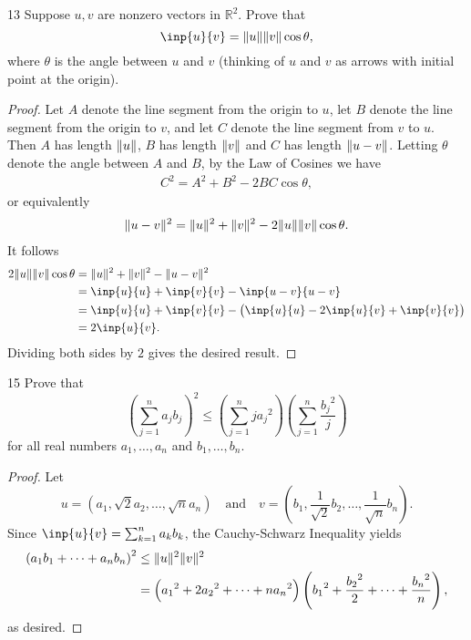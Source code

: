 \documentclass{extarticle}
\newenvironment{problem}[1]{\begin{prob*}{#1}{}}{\end{prob*}}
\newcommand{\R}{\mathbb{R}}
\DeclarePairedDelimiter\Norm{\lVert}{\rVert}
\begin{document}
\begin{problem}{13}
Suppose $u,v$ are nonzero vectors in $\R^2$.  Prove that
\begin{equation*}
\inp{u}{v} = \Norm{u}\Norm{v}\cos\theta,
\end{equation*}
where $\theta$ is the angle between $u$ and $v$ (thinking of $u$ and $v$ as arrows with initial point at the origin).
\end{problem}
\begin{proof}
Let $A$ denote the line segment from the origin to $u$, let $B$ denote the line segment from the origin to $v$, and let $C$ denote the line segment from $v$ to $u$.  Then $A$ has length $\Norm{u}$, $B$ has length $\Norm{v}$ and $C$ has length $\Norm{u - v}$.  Letting $\theta$ denote the angle between $A$ and $B$, by the Law of Cosines we have
\begin{align*}
C^2 = A^2 + B^2 - 2BC\cos\theta,
\end{align*} 
or equivalently
\begin{align*}
\Norm{u - v}^2 = \Norm{u}^2 + \Norm{v}^2 - 2\Norm{u}\Norm{v}\cos\theta.
\end{align*}
It follows
\begin{align*}
2\Norm{u}\Norm{v}\cos\theta &= \Norm{u}^2 + \Norm{v}^2 - \Norm{u-v}^2\\
&= \inp{u}{u} + \inp{v}{v} - \inp{u-v}{u-v}\\
&= \inp{u}{u} + \inp{v}{v} - \left(\inp{u}{u} - 2\inp{u}{v} + \inp{v}{v}\right)\\
&= 2\inp{u}{v}.
\end{align*}
Dividing both sides by $2$ gives the desired result.
\end{proof}

\begin{problem}{15}
Prove that 
\begin{equation*}
\left(\sum_{j = 1}^na_j b_j\right)^2 \leq \left(\sum_{j = 1}^nj{a_j}^2\right)\left(\sum_{j=1}^n\frac{{b_j}^2}{j}\right)
\end{equation*}
for all real numbers $a_1,\dots,a_n$ and $b_1,\dots,b_n$.
\end{problem}
\begin{proof}
Let
\begin{equation*}
u = \left(a_1, \sqrt{2}a_2, \dots, \sqrt{n}a_n\right)\quad\text{and}\quad v =\left(b_1, \frac{1}{\sqrt{2}}b_2,\dots, \frac{1}{\sqrt{n}}b_n\right).
\end{equation*}
Since $\inp{u}{v} = \sum_{k=1}^na_kb_k$, the Cauchy-Schwarz Inequality yields
\begin{align*}
\left(a_1b_1 +\dots + a_nb_n\right)^2 &\leq \Norm{u}^2\Norm{v}^2\\
&=\left({a_1}^2 + 2{a_2}^2 + \dots + n{a_n}^2\right)\left({b_1}^2 + \frac{{b_2}^2}{2} + \dots + \frac{{b_n}^2}{n}\right),
\end{align*}
as desired.
\end{proof}
\end{document}
